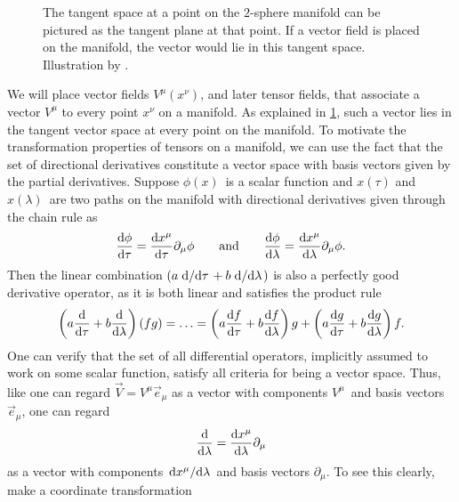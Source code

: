 \begin{figure}
\centering

\caption{\label{fig:tangent_space}The tangent space at a point on the $2$-sphere manifold can be pictured as the tangent plane at that point. If a vector field is placed on the manifold, the vector would lie in this tangent space. Illustration by \cite{ref:figure_tangent_space}.}
\end{figure}


\newcommand\lincombo[1]{\left( a \odv{#1}{\tau} + b \odv{#1}{\lambda} \right)}
\newcommand\lincomboslash[1]{\left( a \odv{#1}/{\tau} + b \odv{#1}/{\lambda} \right)}
We will place vector fields $V^\mu(x^\nu)$, and later tensor fields, that associate a vector $V^\mu$ to every point $x^\nu$ on a manifold.
As explained in \cref{fig:tangent_space}, such a vector lies in the tangent vector space at every point on the manifold.
To motivate the transformation properties of tensors on a manifold, we can use the fact that the set of directional derivatives constitute a vector space with basis vectors given by the partial derivatives. 
Suppose $\phi(x)$ is a scalar function and $x(\tau)$ and $x(\lambda)$ are two paths on the manifold with directional derivatives given through the chain rule as
\begin{equation}
	\odv{\phi}{\tau} = \odv{x^\mu}{\tau} \partial_\mu \phi
	\qquad \text{and} \qquad
	\odv{\phi}{\lambda} = \odv{x^\mu}{\lambda} \partial_\mu \phi .
\end{equation}
Then the linear combination $\lincomboslash{}$ is also a perfectly good derivative operator, as it is both linear and satisfies the product rule
\begin{equation}
	\lincombo{}(fg) = \ldots = \lincombo{f} g + \lincombo{g} f .
\end{equation}
One can verify that the set of all differential operators, implicitly assumed to work on some scalar function, satisfy all criteria for being a vector space.
Thus, like one can regard $\vec{V} = V^\mu \vec{e}_\mu$ as a vector with components $V^\mu$ and basis vectors $\vec{e}_\mu$, one can regard
\begin{equation}
	\odv{}{\lambda} = \odv{x^{\mu}}{\lambda} \partial_{\mu} 
\end{equation}
as a vector with components $\odv{x^{\mu}}/{\lambda}$ and basis vectors $\partial_\mu$.
To see this clearly, make a coordinate transformation
